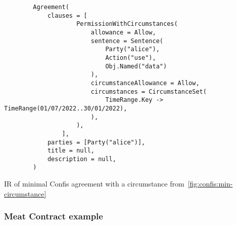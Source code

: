 \begin{code}
    \begin{verbatim}
        Agreement(
            clauses = [
                    PermissionWithCircumstances(
                        allowance = Allow,
                        sentence = Sentence(
                            Party("alice"),
                            Action("use"),
                            Obj.Named("data")
                        ),
                        circumstanceAllowance = Allow,
                        circumstances = CircumstanceSet(
                            TimeRange.Key -> TimeRange(01/07/2022..30/01/2022),
                        ),
                    ),
                ],
            parties = [Party("alice")],
            title = null,
            description = null,
        )
    \end{verbatim}
    \caption{IR of minimal Confis agreement with a circumstance from~\autoref{fig:confis:min-circumstance}}
    \label{fig:confis:min-circumstance-ir}
\end{code}

\subsubsection{Meat Contract example}


